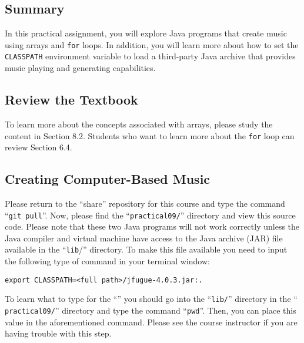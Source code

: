 



\subsection*{Summary}
\vspace*{-.05in}

In this practical assignment, you will explore Java programs that create music using arrays and {\tt for} loops. In
addition, you will learn more about how to set the {\tt CLASSPATH} environment variable to load a third-party Java
archive that provides music playing and generating capabilities.

\vspace*{-.1in}
\subsection*{Review the Textbook}
\vspace*{-.05in}

To learn more about the concepts associated with arrays, please study the content in Section 8.2. Students who want to
learn more about the {\tt for} loop can review Section 6.4.

\vspace*{-.1in}
\subsection*{Creating Computer-Based Music}
\vspace*{-.05in}

Please return to the ``share'' repository for this course and type the command ``{\tt git pull}''. Now, please find the
``{\tt practical09/}'' directory and view this source code. Please note that these two Java programs will not work
correctly unless the Java compiler and virtual machine have access to the Java archive (JAR) file available in the
``{\tt lib}/'' directory. To make this file available you need to input the following type of command in your terminal
window:

  {\tt export CLASSPATH=<full path>/jfugue-4.0.3.jar:.}

  To learn what to type for the ``{\tt <full path>}'' you should go into the ``{\tt lib/}'' directory in the ``{\tt
practical09/}'' directory and type the command ``{\tt pwd}''.  Then, you can place this value in the aforementioned
command. Please see the course instructor if you are having trouble with this step.

